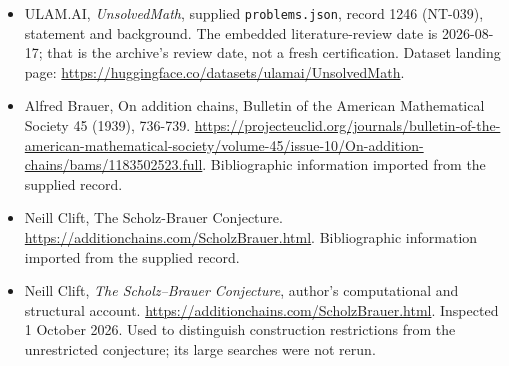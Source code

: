 \documentclass[11pt,a4paper]{article}
\begin{document}
{\small

\begin{itemize}

\item[\hypertarget{source:1246:1}{S1}] ULAM.AI, \emph{UnsolvedMath}, supplied \texttt{problems.json}, record 1246 (NT-039), statement and background. The embedded literature-review date is 2026-08-17; that is the archive’s review date, not a fresh certification. Dataset landing page: \url{https://huggingface.co/datasets/ulamai/UnsolvedMath}.

\item[\hypertarget{source:1246:2}{S2}] Alfred Brauer, On addition chains, Bulletin of the American Mathematical Society 45 (1939), 736-739. \url{https://projecteuclid.org/journals/bulletin-of-the-american-mathematical-society/volume-45/issue-10/On-addition-chains/bams/1183502523.full}. Bibliographic information imported from the supplied record.

\item[\hypertarget{source:1246:3}{S3}] Neill Clift, The Scholz-Brauer Conjecture. \url{https://additionchains.com/ScholzBrauer.html}. Bibliographic information imported from the supplied record.


\item[E1] Neill Clift, \emph{The Scholz--Brauer Conjecture},
author's computational and structural account.
\url{https://additionchains.com/ScholzBrauer.html}.
Inspected 1 October 2026. Used to distinguish construction restrictions
from the unrestricted conjecture; its large searches were not rerun.

\end{itemize}

}

\label{end:1246}
\end{document}
